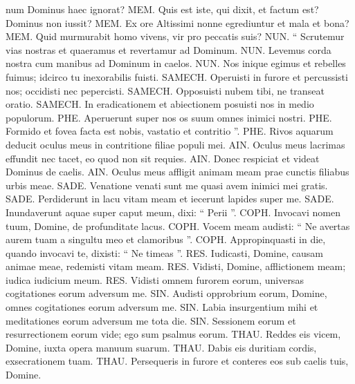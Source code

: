 \begin{biblechapter}
\begin{biblechapter}
\begin{biblechapter}
 num Dominus haec ignorat?
 \verse MEM. Quis est iste, qui dixit, et factum est?
 Dominus non iussit?
 \verse MEM. Ex ore Altissimi nonne egrediuntur
 et mala et bona?
 \verse MEM. Quid murmurabit homo vivens,
 vir pro peccatis suis?
 \verse NUN. “ Scrutemur vias nostras et quaeramus
 et revertamur ad Dominum.
 \verse NUN. Levemus corda nostra cum manibus
 ad Dominum in caelos.
 \verse NUN. Nos inique egimus et rebelles fuimus;
 idcirco tu inexorabilis fuisti.
 \verse SAMECH. Operuisti in furore et percussisti nos;
 occidisti nec pepercisti.
 \verse SAMECH. Opposuisti nubem tibi,
 ne transeat oratio.
 \verse SAMECH. In eradicationem et abiectionem posuisti nos
 in medio populorum.
 \verse PHE. Aperuerunt super nos os suum
 omnes inimici nostri.
 \verse PHE. Formido et fovea facta est nobis,
 vastatio et contritio ”.
 \verse PHE. Rivos aquarum deducit oculus meus
 in contritione filiae populi mei.
 \verse AIN. Oculus meus lacrimas effundit nec tacet,
 eo quod non sit requies.
 \verse AIN. Donec respiciat et videat
 Dominus de caelis.
 \verse AIN. Oculus meus affligit animam meam
 prae cunctis filiabus urbis meae.
 \verse SADE. Venatione venati sunt me quasi avem
 inimici mei gratis.
 \verse SADE. Perdiderunt in lacu vitam meam
 et iecerunt lapides super me.
 \verse SADE. Inundaverunt aquae super caput meum,
 dixi: “ Perii ”.
 \verse COPH. Invocavi nomen tuum, Domine,
 de profunditate lacus.
 \verse COPH. Vocem meam audisti: “ Ne avertas
 aurem tuam a singultu meo et clamoribus ”.
 \verse COPH. Appropinquasti in die, quando invocavi te,
 dixisti: “ Ne timeas ”.
 \verse RES. Iudicasti, Domine, causam animae meae,
 redemisti vitam meam.
 \verse RES. Vidisti, Domine, afflictionem meam;
 iudica iudicium meum.
 \verse RES. Vidisti omnem furorem eorum, universas cogitationes eorum adversum me.
 \verse SIN. Audisti opprobrium eorum, Domine,
 omnes cogitationes eorum adversum me.
 \verse SIN. Labia insurgentium mihi et meditationes eorum
 adversum me tota die.
 \verse SIN. Sessionem eorum et resurrectionem eorum vide;
 ego sum psalmus eorum.
 \verse THAU. Reddes eis vicem, Domine,
 iuxta opera manuum suarum.
 \verse THAU. Dabis eis duritiam cordis,
 exsecrationem tuam.
 \verse THAU. Persequeris in furore et conteres eos
 sub caelis tuis, Domine.
 

\end{biblechapter}
\end{biblechapter}
\end{biblechapter}
